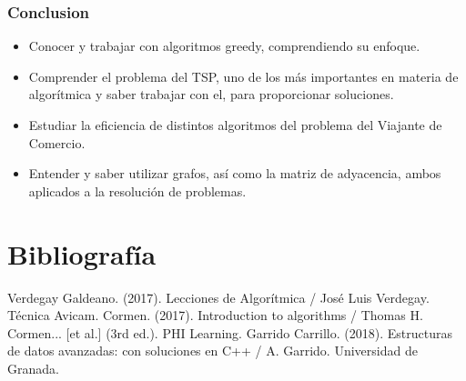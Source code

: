 \documentclass[13pt]{beamer}
\begin{document}
    \begin{frame}
		\frametitle{Conclusion}
			\begin{itemize}
				\item Conocer y trabajar con algoritmos greedy, comprendiendo su enfoque.
				\item Comprender el problema del TSP, uno de los más importantes en materia de algorítmica y saber trabajar con el, para proporcionar soluciones.
				\item Estudiar la eficiencia de distintos algoritmos del problema del Viajante de Comercio.
				\item Entender y saber utilizar grafos, así como la matriz de adyacencia, ambos aplicados a la resolución de problemas.
			\end{itemize}		
	\end{frame}


    \section{Bibliografía}

    \begin{frame}
        \begin{thebibliography}{0}
             Verdegay Galdeano. (2017). Lecciones de Algorítmica / José Luis Verdegay. Técnica Avicam.
             Cormen. (2017). Introduction to algorithms / Thomas H. Cormen... [et al.] (3rd ed.). PHI Learning.
             Garrido Carrillo. (2018). Estructuras de datos avanzadas: con soluciones en C++ / A. Garrido. Universidad de Granada.  
        \end{thebibliography}
    \end{frame}
\end{document}
